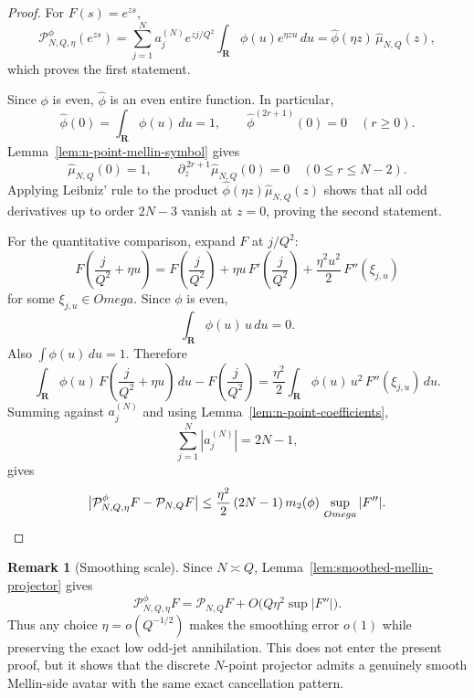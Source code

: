\documentclass[11pt,a4paper]{amsart}
\def\Omega{Omega}%
\theoremstyle{plain}
\theoremstyle{definition}
\newtheorem{remark}[theorem]{Remark}
\begin{document}
\begin{proof}
For $F(s)=e^{zs}$,
\[
\mathcal P_{N,Q,\eta}^{\phi}(e^{zs})
=
\sum_{j=1}^N a_j^{(N)}e^{zj/Q^2}
\int_{\mathbf R}\phi(u)e^{\eta zu}\,du
=
\widehat\phi(\eta z)\,\widehat\mu_{N,Q}(z),
\]
which proves the first statement.

Since $\phi$ is even, $\widehat\phi$ is an even entire function. In
particular,
\[
\widehat\phi(0)=\int_{\mathbf R}\phi(u)\,du=1,
\qquad
\widehat\phi^{(2r+1)}(0)=0
\quad (r\ge 0).
\]
Lemma~\ref{lem:n-point-mellin-symbol} gives
\[
\widehat\mu_{N,Q}(0)=1,
\qquad
\partial_z^{\,2r+1}\widehat\mu_{N,Q}(0)=0
\quad (0\le r\le N-2).
\]
Applying Leibniz' rule to the product
$\widehat\phi(\eta z)\widehat\mu_{N,Q}(z)$ shows that all odd derivatives up
to order $2N-3$ vanish at $z=0$, proving the second statement.

For the quantitative comparison, expand $F$ at $j/Q^2$:
\[
F\!\left(\frac{j}{Q^2}+\eta u\right)
=
F\!\left(\frac{j}{Q^2}\right)
+
\eta u\,F'\!\left(\frac{j}{Q^2}\right)
+
\frac{\eta^2u^2}{2}\,F''(\xi_{j,u})
\]
for some $\xi_{j,u}\in\Omega$. Since $\phi$ is even,
\[
\int_{\mathbf R}\phi(u)\,u\,du=0.
\]
Also $\int \phi(u)\,du=1$. Therefore
\[
\int_{\mathbf R}\phi(u)\,
F\!\left(\frac{j}{Q^2}+\eta u\right)\,du
-
F\!\left(\frac{j}{Q^2}\right)
=
\frac{\eta^2}{2}
\int_{\mathbf R}\phi(u)\,u^2\,F''(\xi_{j,u})\,du.
\]
Summing against $a_j^{(N)}$ and using
Lemma~\ref{lem:n-point-coefficients},
\[
\sum_{j=1}^N |a_j^{(N)}|=2N-1,
\]
gives
\[
\bigl|\mathcal P_{N,Q,\eta}^{\phi}F-\mathcal P_{N,Q}F\bigr|
\le
\frac{\eta^2}{2}\,(2N-1)\,m_2(\phi)\,
\sup_{\Omega}|F''|.
\qedhere
\]
\end{proof}

\begin{remark}[Smoothing scale]
\label{rem:smoothing-scale-mellin-projector}
Since $N\asymp Q$, Lemma~\ref{lem:smoothed-mellin-projector} gives
\[
\mathcal P_{N,Q,\eta}^{\phi}F
=
\mathcal P_{N,Q}F
+
O\!\bigl(Q\eta^2\sup|F''|\bigr).
\]
Thus any choice $\eta=o(Q^{-1/2})$ makes the smoothing error $o(1)$ while
preserving the exact low odd-jet annihilation. This does not enter the present
proof, but it shows that the discrete $N$-point projector admits a genuinely
smooth Mellin-side avatar with the same exact cancellation pattern.
\end{remark}
\end{document}
